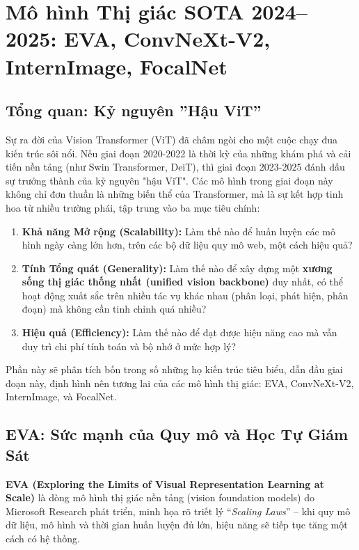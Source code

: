 \section{Mô hình Thị giác SOTA 2024–2025: EVA, ConvNeXt-V2, InternImage, FocalNet}
\label{sec:sota_vision_models_2024_2025}

\subsection{Tổng quan: Kỷ nguyên ''Hậu ViT''}
\label{subsec:post_vit_era_overview}
Sự ra đời của Vision Transformer (ViT) đã châm ngòi cho một cuộc chạy đua kiến trúc sôi nổi. Nếu giai đoạn 2020-2022 là thời kỳ của những khám phá và cải tiến nền tảng (như Swin Transformer, DeiT), thì giai đoạn 2023-2025 đánh dấu sự trưởng thành của kỷ nguyên "hậu ViT". Các mô hình trong giai đoạn này không chỉ đơn thuần là những biến thể của Transformer, mà là sự kết hợp tinh hoa từ nhiều trường phái, tập trung vào ba mục tiêu chính:
\begin{enumerate}
	\item \textbf{Khả năng Mở rộng (Scalability):} Làm thế nào để huấn luyện các mô hình ngày càng lớn hơn, trên các bộ dữ liệu quy mô web, một cách hiệu quả?
	\item \textbf{Tính Tổng quát (Generality):} Làm thế nào để xây dựng một \textbf{xương sống thị giác thống nhất (unified vision backbone)} duy nhất, có thể hoạt động xuất sắc trên nhiều tác vụ khác nhau (phân loại, phát hiện, phân đoạn) mà không cần tinh chỉnh quá nhiều?
	\item \textbf{Hiệu quả (Efficiency):} Làm thế nào để đạt được hiệu năng cao mà vẫn duy trì chi phí tính toán và bộ nhớ ở mức hợp lý?
\end{enumerate}
Phần này sẽ phân tích bốn trong số những họ kiến trúc tiêu biểu, dẫn đầu giai đoạn này, định hình nên tương lai của các mô hình thị giác: EVA, ConvNeXt-V2, InternImage, và FocalNet.

\subsection{EVA: Sức mạnh của Quy mô và Học Tự Giám Sát}
\label{subsec:eva_model}

\textbf{EVA (Exploring the Limits of Visual Representation Learning at Scale)} \cite{Fang2023} là dòng mô hình thị giác nền tảng (vision foundation models) do Microsoft Research phát triển, minh họa rõ triết lý “\textit{Scaling Laws}” – khi quy mô dữ liệu, mô hình và thời gian huấn luyện đủ lớn, hiệu năng sẽ tiếp tục tăng một cách có hệ thống.

